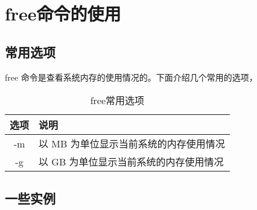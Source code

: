\section{free命令的使用}
\label{sec:freeCmd}

\subsection{常用选项}
\label{subsec:freeOptions}

free 命令是查看系统内存的使用情况的。下面介绍几个常用的选项，

\begin{table}[htbp]
  \centering
    \caption{free常用选项}
    \label{tab:freeSomeOpts}
    \begin{tabular}{cl}
      \toprule
      选项     & 说明 \\
      \midrule
      -m        & 以 MB 为单位显示当前系统的内存使用情况 \\
      -g        & 以 GB 为单位显示当前系统的内存使用情况 \\
      \bottomrule
    \end{tabular}
\end{table}

\subsection{一些实例}
\label{subsec:freeInstances}
